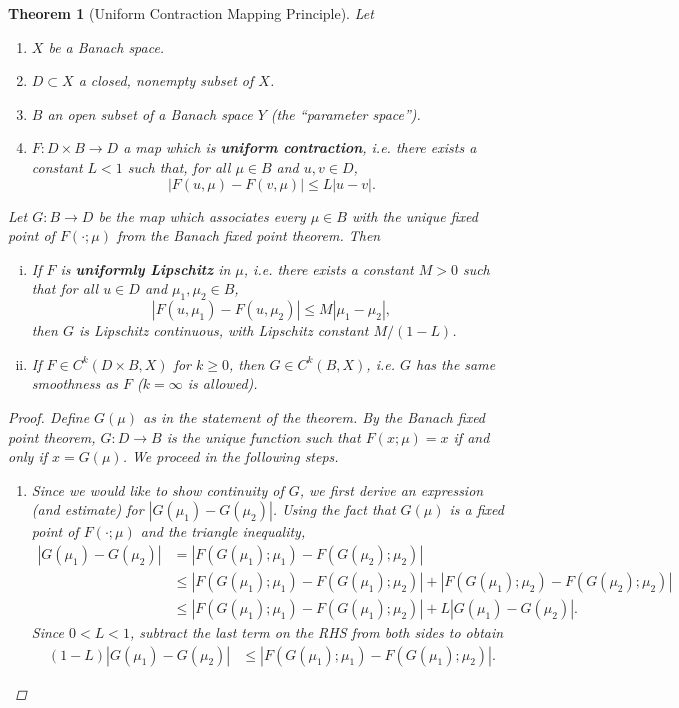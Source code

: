 \documentclass[12pt]{amsart}         %
\newtheorem{theorem}{Theorem}[section]
\theoremstyle{remark}
\begin{document}
\begin{theorem}[Uniform Contraction Mapping Principle]
Let 
\begin{enumerate}
\item $X$ be a Banach space.
\item $D \subset X$ a closed, nonempty subset of $X$.
\item $B$ an open subset of a Banach space $Y$ (the ``parameter space'').
\item $F: D \times B \rightarrow D$ a map which is \textbf{uniform contraction}, i.e. there exists a constant $L < 1$ such that, for all $\mu \in B$ and $u, v \in D$,
\begin{equation*}
|F(u, \mu) - F(v, \mu)| \leq L|u - v|.
\end{equation*}
\end{enumerate}
Let $G: B \rightarrow D$ be the map which associates every $\mu \in B$ with the unique fixed point of $F(\cdot; \mu)$ from the Banach fixed point theorem. Then

\begin{enumerate}[(i)]
\item If $F$ is \textbf{uniformly Lipschitz} in $\mu$, i.e. there exists a constant $M > 0$ such that for all $u \in D$ and $\mu_1, \mu_2 \in B$, 
\[
|F(u, \mu_1) - F(u, \mu_2)| \leq M |\mu_1 - \mu_2|,
\]
then $G$ is Lipschitz continuous, with Lipschitz constant $M / (1 - L)$.
\item If $F \in C^k(D \times B, X)$ for $k \geq 0$, then $G \in C^k(B, X)$, i.e. $G$ has the same smoothness as $F$ ($k = \infty$ is allowed).
\end{enumerate}
\begin{proof}

Define $G(\mu)$ as in the statement of the theorem. By the Banach fixed point theorem, $G: D \rightarrow B$ is the unique function such that $F(x; \mu) = x$ if and only if $x = G(\mu)$. We proceed in the following steps.
\begin{enumerate}
\item Since we would like to show continuity of $G$, we first derive an expression (and estimate) for $|G(\mu_1) - G(\mu_2)|$. Using the fact that $G(\mu)$ is a fixed point of $F(\cdot; \mu)$ and the triangle inequality,
\begin{align*}
|G(\mu_1) - G(\mu_2)| &= |F( G(\mu_1); \mu_1) - F(G(\mu_2); \mu_2)| \\
&\leq |F( G(\mu_1); \mu_1) - F(G(\mu_1); \mu_2)| + |F( G(\mu_1); \mu_2) - F(G(\mu_2); \mu_2)| \\
&\leq |F( G(\mu_1); \mu_1) - F(G(\mu_1); \mu_2)| + L |G(\mu_1) - G(\mu_2)|.
\end{align*}
Since $0 < L < 1$, subtract the last term on the RHS from both sides to obtain
\begin{align*}
(1 - L)|G(\mu_1) - G(\mu_2)| 
&\leq |F( G(\mu_1); \mu_1) - F(G(\mu_1); \mu_2)|.
\end{align*}


\end{enumerate}
\end{proof}
\end{theorem}
\end{document}
